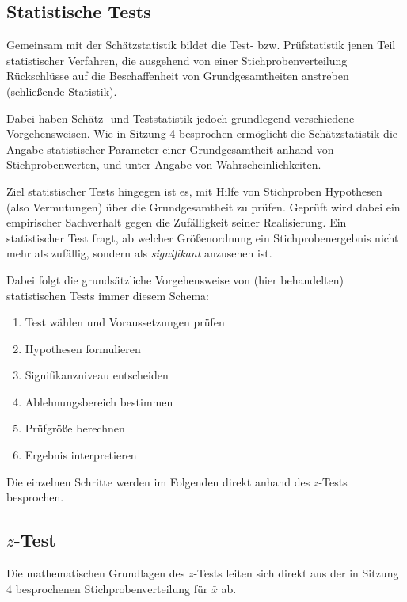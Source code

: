 \documentclass[
  ngerman,
]{article}
\providecommand{\tightlist}{%
  \setlength{\itemsep}{0pt}\setlength{\parskip}{0pt}}
\begin{document}
\hypertarget{statistische-tests}{%
\subsection{Statistische Tests}\label{statistische-tests}}

Gemeinsam mit der Schätzstatistik bildet die Test- bzw. Prüfstatistik jenen Teil statistischer Verfahren, die ausgehend von einer Stichprobenverteilung Rückschlüsse auf die Beschaffenheit von Grundgesamtheiten anstreben (schließende Statistik).

Dabei haben Schätz- und Teststatistik jedoch grundlegend verschiedene Vorgehensweisen. Wie in Sitzung 4 besprochen ermöglicht die Schätzstatistik die Angabe statistischer Parameter einer Grundgesamtheit anhand von Stichprobenwerten, und unter Angabe von Wahrscheinlichkeiten.

Ziel statistischer Tests hingegen ist es, mit Hilfe von Stichproben Hypothesen (also Vermutungen) über die Grundgesamtheit zu prüfen. Geprüft wird dabei ein empirischer Sachverhalt gegen die Zufälligkeit seiner Realisierung. Ein statistischer Test fragt, ab welcher Größenordnung ein Stichprobenergebnis nicht mehr als zufällig, sondern als \emph{signifikant} anzusehen ist.

Dabei folgt die grundsätzliche Vorgehensweise von (hier behandelten) statistischen Tests immer diesem Schema:

\begin{enumerate}
\def\labelenumi{\arabic{enumi}.}
\tightlist
\item
  Test wählen und Voraussetzungen prüfen
\item
  Hypothesen formulieren
\item
  Signifikanzniveau entscheiden
\item
  Ablehnungsbereich bestimmen
\item
  Prüfgröße berechnen
\item
  Ergebnis interpretieren
\end{enumerate}

Die einzelnen Schritte werden im Folgenden direkt anhand des \(z\)-Tests besprochen.

\hypertarget{z-test}{%
\subsection{\texorpdfstring{\(z\)-Test}{z-Test}}\label{z-test}}

Die mathematischen Grundlagen des \(z\)-Tests leiten sich direkt aus der in Sitzung 4 besprochenen Stichprobenverteilung für \(\bar{x}\) ab.
\end{document}
